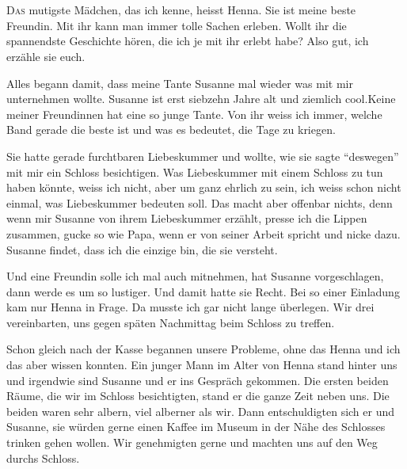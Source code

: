 \chapter*{}
\lettrine[lines=3]{\color{red}D}{as} mutigste Mädchen, das ich kenne, heisst Henna. Sie ist meine beste Freundin. Mit ihr kann man immer tolle Sachen erleben. Wollt ihr die spannendste Geschichte hören, die ich je mit ihr erlebt habe? Also gut, ich erzähle sie euch.

Alles begann damit, dass meine Tante Susanne mal wieder was mit mir unternehmen wollte. Susanne ist erst siebzehn Jahre alt und ziemlich cool.Keine meiner Freundinnen hat eine so junge Tante. Von ihr weiss ich immer, welche Band gerade die beste ist und was es bedeutet, die Tage zu kriegen.

Sie hatte gerade furchtbaren Liebeskummer und wollte, wie sie sagte \enquote{deswegen} mit mir ein Schloss besichtigen. Was Liebeskummer mit einem Schloss zu tun haben könnte, weiss ich nicht, aber um ganz ehrlich zu sein, ich weiss schon nicht einmal, was Liebeskummer bedeuten soll. Das macht aber offenbar nichts, denn wenn mir Susanne von ihrem Liebeskummer erzählt, presse ich die Lippen zusammen, gucke so wie Papa, wenn er von seiner Arbeit spricht und nicke dazu. Susanne findet, dass ich die einzige bin, die sie versteht.

Und eine Freundin solle ich mal auch mitnehmen, hat Susanne vorgeschlagen, dann werde es um so lustiger. Und damit hatte sie Recht. Bei so einer Einladung kam nur Henna in Frage. Da musste ich gar nicht lange überlegen. Wir drei vereinbarten, uns gegen späten Nachmittag beim Schloss zu treffen.

Schon gleich nach der Kasse begannen unsere Probleme, ohne das Henna und ich das aber wissen konnten. Ein junger Mann im Alter von Henna stand hinter uns und irgendwie sind Susanne und er ins Gespräch gekommen. Die ersten beiden Räume, die wir im Schloss besichtigten, stand er die ganze Zeit neben uns. Die beiden waren sehr albern, viel alberner als wir. Dann entschuldigten sich er und Susanne, sie würden gerne einen Kaffee im Museum in der Nähe des Schlosses trinken gehen wollen. Wir genehmigten gerne und machten uns auf den Weg durchs Schloss.

